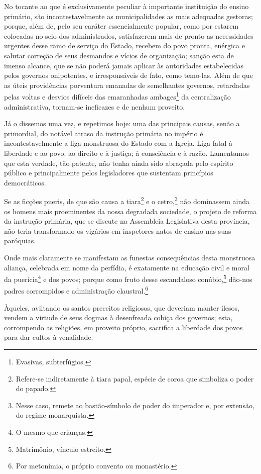 No tocante ao que é exclusivamente peculiar à importante instituição do
ensino primário, são incontestavelmente as municipalidades as mais
adequadas gestoras; porque, além de, pelo seu caráter essencialmente
popular, como por estarem colocadas no seio dos administrados,
satisfazerem mais de pronto as necessidades urgentes desse ramo de
serviço do Estado, recebem do povo pronta, enérgica e salutar correção
de seus desmandos e vícios de organização; sanção esta de imenso
alcance, que se não poderá jamais aplicar às autoridades estabelecidas
pelos governos onipotentes, e irresponsáveis de fato, como temo-las.
Além de que as úteis providências porventura emanadas de semelhantes
governos, retardadas pelas voltas e desvios difíceis das emaranhadas
ambages\footnote{Evasivas, subterfúgios.} da centralização
administrativa, tornam-se ineficazes e de nenhum proveito.

Já o dissemos uma vez, e repetimos hoje: uma das principais causas,
senão a primordial, do notável atraso da instrução primária no império é
incontestavelmente a liga monstruosa do Estado com a Igreja. Liga fatal
à liberdade e ao povo; ao direito e à justiça; à consciência e à razão.
Lamentamos que esta verdade, tão patente, não tenha ainda sido abraçada
pelo espírito público e principalmente pelos legisladores que sustentam
princípios democráticos.

Se as ficções pueris, de que são causa a tiara\footnote{Refere-se
  indiretamente à tiara papal, espécie de coroa que simboliza o poder do
  papado.} e o cetro,\footnote{Nesse caso, remete ao bastão-símbolo de
  poder do imperador e, por extensão, do regime monarquista.} não
dominassem ainda os homens mais proeminentes da nossa degradada
sociedade, o projeto de reforma da instrução primária, que se discute na
Assembleia Legislativa desta província, não teria transformado os
vigários em inspetores natos de ensino nas suas paróquias.

Onde mais claramente se manifestam as funestas consequências desta
monstruosa aliança, celebrada em nome da perfídia, é exatamente na
educação civil e moral da puerícia\footnote{O mesmo que crianças.} e
dos povos; porque como fruto desse escandaloso conúbio,\footnote{
  Matrimônio, vínculo estreito.} dão-nos padres corrompidos e
administração claustral.\footnote{Por metonímia, o próprio convento ou
  monastério.}

Àqueles, aviltando os santos preceitos religiosos, que deveriam manter
ilesos, vendem a virtude de seus dogmas à desenfreada cobiça dos
governos; esta, corrompendo as religiões, em proveito próprio, sacrifica
a liberdade dos povos para dar cultos à venalidade.

